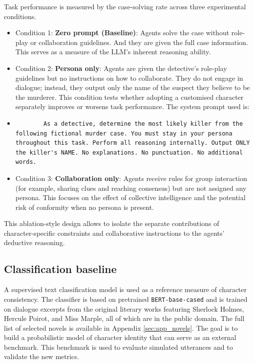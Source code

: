 \documentclass{article}
\begin{document}
Task performance is measured by the case-solving rate across three experimental conditions.

\begin{itemize}
    \item Condition 1: \textbf{Zero prompt (Baseline)}: Agents solve the case without role-play or collaboration guidelines. And they are given the full case information. This serves as a measure of the LLM's inherent reasoning ability.
    \item Condition 2: \textbf{Persona only}: Agents are given the detective's role-play guidelines but no instructions on how to collaborate. They do not engage in dialogue; instead, they output only the name of the suspect they believe to be the murderer. This condition tests whether adopting a customised character separately improves or worsens task performance. The system prompt used is:
    \item[] 
    \begin{verbatim}
        As a detective, determine the most likely killer from the following fictional murder case. You must stay in your persona throughout this task. Perform all reasoning internally. Output ONLY the killer's NAME. No explanations. No punctuation. No additional words.
    \end{verbatim}
    \item Condition 3: \textbf{Collaboration only}: Agents receive rules for group interaction (for example, sharing clues and reaching consensus) but are not assigned any persona. This focuses on the effect of collective intelligence and the potential risk of conformity when no persona is present.
\end{itemize}

This ablation-style design allows to isolate the separate contributions of character-specific constraints and collaborative instructions to the agents' deductive reasoning.


\subsection{Classification baseline} \label{sec:eval_baseline}

A supervised text classification model is used as a reference measure of character consistency. The classifier is based on pretrained \texttt{BERT-base-cased} \citep{devlin2019bert} and is trained on dialogue excerpts from the original literary works featuring Sherlock Holmes, Hercule Poirot, and Miss Marple, all of which are in the public domain. The full list of selected novels is available in Appendix \ref{sec:app_novels}. The goal is to build a probabilistic model of character identity that can serve as an external benchmark. This benchmark is used to evaluate simulated utterances and to validate the new metrics.
\end{document}
